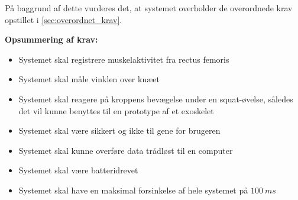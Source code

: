 På baggrund af dette vurderes det, at systemet overholder de overordnede krav opstillet i \autoref{sec:overordnet_krav}. 

\vspace{3mm}
\textbf{Opsummering af krav:}
\begin{itemize}
\item[\text{\sffamily \checkmark}] Systemet skal registrere muskelaktivitet fra rectus femoris 
\item[\text{\sffamily \checkmark}] Systemet skal måle vinklen over knæet
\item[\text{\sffamily \checkmark}] Systemet skal reagere på kroppens bevægelse under en squat-øvelse, således det vil kunne benyttes til en prototype af et exoskelet
\item[\text{\sffamily \checkmark}] Systemet skal være sikkert og ikke til gene for brugeren 
\item[\text{\sffamily \checkmark}] Systemet skal kunne overføre data trådløst til en computer
\item[\text{\sffamily \checkmark}] Systemet skal være batteridrevet
\item[\text{\sffamily \checkmark}] Systemet skal have en maksimal forsinkelse af hele systemet på $100~ms$
\end{itemize}
